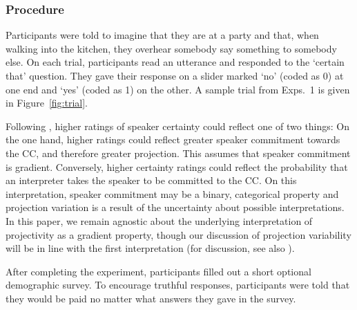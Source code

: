 \documentclass[a4paper,12pt,twoside]{article}
\begin{document}

		
        \subsubsection{Procedure}

			Participants were told to imagine that they are at a party and that, when walking into the kitchen, they overhear somebody say something to somebody else.
            On each trial, participants read an utterance and responded to the `certain that'   question. They gave their response on a slider marked `no' (coded as 0) at one end and `yes' (coded as 1) on the other. A sample trial from Exps.~1 is given in Figure~\ref{fig:trial}. 
            
            Following \citet{tonhauser_how_2018}, higher ratings of speaker certainty could reflect one of two things:
            On the one hand, higher ratings could reflect greater speaker commitment towards the CC, and therefore greater projection. This assumes that speaker commitment is gradient.
            Conversely, higher certainty ratings could reflect the probability that an interpreter takes the speaker to be committed to the CC.  On this interpretation, speaker commitment may be a binary, categorical property and projection variation is a result of the uncertainty about possible interpretations. %
            In this paper, we remain agnostic about the underlying interpretation of projectivity as a gradient property, though our discussion of projection variability will be in line with the first interpretation (for discussion, see also \citealt{grove_factivity_2023}).


	
   
             After completing the experiment, participants filled out a short optional demographic survey. To encourage truthful responses, participants were told that they would be paid no matter what answers they gave in the survey.
\end{document}
